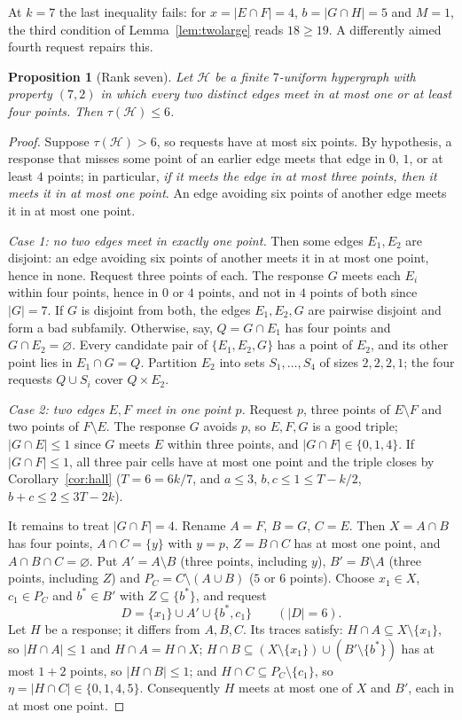 \documentclass[11pt]{article}
\numberwithin{equation}{section}
\newtheorem{proposition}[theorem]{Proposition}
\theoremstyle{definition}
\theoremstyle{remark}
\newcommand{\HH}{\mathcal H}
\begin{document}
At $k=7$ the last inequality fails: for $x=|E\cap F|=4$, $b=|G\cap H|=5$
and $M=1$, the third condition of Lemma~\ref{lem:twolarge} reads
$18\ge19$. A differently aimed fourth request repairs this.

\begin{proposition}[Rank seven]\label{prop:rankseven}
Let $\HH$ be a finite $7$-uniform hypergraph with property $(7,2)$ in
which every two distinct edges meet in at most one or at least four
points. Then $\tau(\HH)\le6$.
\end{proposition}

\begin{proof}
Suppose $\tau(\HH)>6$, so requests have at most six points. By
hypothesis, a response that misses some point of an earlier edge meets
that edge in $0$, $1$, or at least $4$ points; in particular,
\emph{if it meets the edge in at most three points, then it meets it in
at most one point}. An edge avoiding six points of another edge meets it
in at most one point.

\emph{Case 1: no two edges meet in exactly one point.} Then some edges
$E_1,E_2$ are disjoint: an edge avoiding six points of another meets it
in at most one point, hence in none. Request three points of each. The response $G$
meets each $E_i$ within four points, hence in $0$ or $4$ points, and not
in $4$ points of both since $|G|=7$. If $G$ is disjoint from both, the
edges $E_1,E_2,G$ are pairwise disjoint and form a bad subfamily.
Otherwise, say, $Q=G\cap E_1$ has four points and $G\cap E_2=\varnothing$.
Every candidate pair of $\{E_1,E_2,G\}$ has a point of $E_2$, and its
other point lies in $E_1\cap G=Q$. Partition $E_2$ into sets
$S_1,\dots,S_4$ of sizes $2,2,2,1$; the four requests $Q\cup S_i$ cover
$Q\times E_2$.

\emph{Case 2: two edges $E,F$ meet in one point $p$.} Request $p$, three
points of $E\setminus F$ and two points of $F\setminus E$. The response
$G$ avoids $p$, so $E,F,G$ is a good triple; $|G\cap E|\le1$ since $G$
meets $E$ within three points, and $|G\cap F|\in\{0,1,4\}$. If
$|G\cap F|\le1$, all three pair cells have at most one point and the
triple closes by Corollary~\ref{cor:hall} ($T=6=6k/7$, and
$a\le3$, $b,c\le1\le T-k/2$, $b+c\le2\le3T-2k$).

It remains to treat $|G\cap F|=4$. Rename $A=F$, $B=G$, $C=E$. Then
$X=A\cap B$ has four points, $A\cap C=\{y\}$ with $y=p$, $Z=B\cap C$ has
at most one point, and $A\cap B\cap C=\varnothing$. Put $A'=A\setminus B$
(three points, including $y$), $B'=B\setminus A$ (three points, including
$Z$) and $P_C=C\setminus(A\cup B)$ ($5$ or $6$ points). Choose
$x_1\in X$, $c_1\in P_C$ and $b^*\in B'$ with $Z\subseteq\{b^*\}$, and
request
\[
 D=\{x_1\}\cup A'\cup\{b^*,c_1\}\qquad(|D|=6).
\]
Let $H$ be a response; it differs from $A,B,C$. Its traces satisfy:
$H\cap A\subseteq X\setminus\{x_1\}$, so $|H\cap A|\le1$ and $H\cap A=H\cap X$;
$H\cap B\subseteq(X\setminus\{x_1\})\cup(B'\setminus\{b^*\})$ has at most
$1+2$ points, so $|H\cap B|\le1$; and $H\cap C\subseteq P_C\setminus\{c_1\}$,
so $\eta=|H\cap C|\in\{0,1,4,5\}$. Consequently $H$ meets at most one of
$X$ and $B'$, each in at most one point.


\end{proof}
\end{document}
